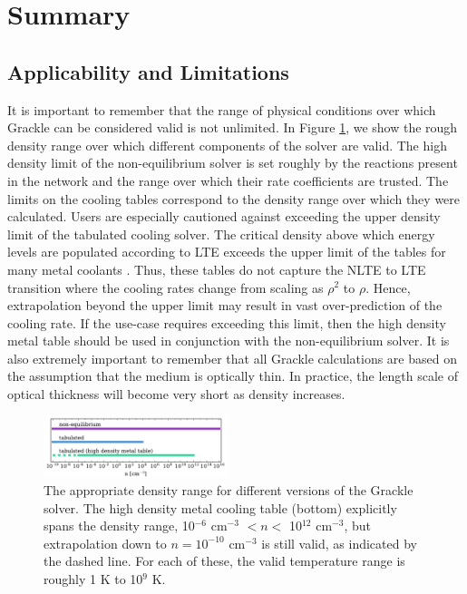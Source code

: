\section{Summary} \label{sec:summary}

\subsection{Applicability and Limitations}

It is important to remember that the range of physical conditions over
which Grackle can be considered valid is not unlimited.  In Figure
\ref{fig:valid-range}, we show the rough density range over which
different components of the solver are valid.  The high density limit
of the non-equilibrium solver is set roughly by the reactions present
in the network and the range over which their rate coefficients are
trusted.  The limits on the cooling tables correspond to the density
range over which they were calculated.  Users are especially
cautioned against exceeding the upper density limit of the tabulated
cooling solver.  The critical density above which energy levels are
populated according to LTE exceeds the upper limit of the tables for
many metal coolants \citep{2008MNRAS.385.1443S}.  Thus, these tables
do not capture the NLTE to LTE transition where the cooling rates
change from scaling as $\rho^{2}$ to $\rho$.  Hence, extrapolation
beyond the upper limit may result in vast over-prediction of the
cooling rate.  If the use-case requires exceeding this limit, then the
high density metal table should be used in conjunction with the
non-equilibrium solver.  It is also extremely important to remember
that all Grackle calculations are based on the assumption that the
medium is optically thin.  In practice, the length scale of optical
thickness will become very short as density increases.

\begin{figure}
  \centering
  \includegraphics[width=0.48\textwidth]{valid_range.pdf}
  \caption{
    The appropriate density range for different versions of the
    Grackle solver.  The high density metal cooling table (bottom)
    explicitly spans the density range, 10$^{-6}$ cm$^{-3}$ $< n <$
    10$^{12}$ cm$^{-3}$, but extrapolation down to $n = 10^{-10}$ cm$^{-3}$ 
    is still valid, as indicated by the dashed line.  For each
    of these, the valid temperature range is roughly 1 K to 10$^{9}$
    K.
  } \label{fig:valid-range}
\end{figure}

